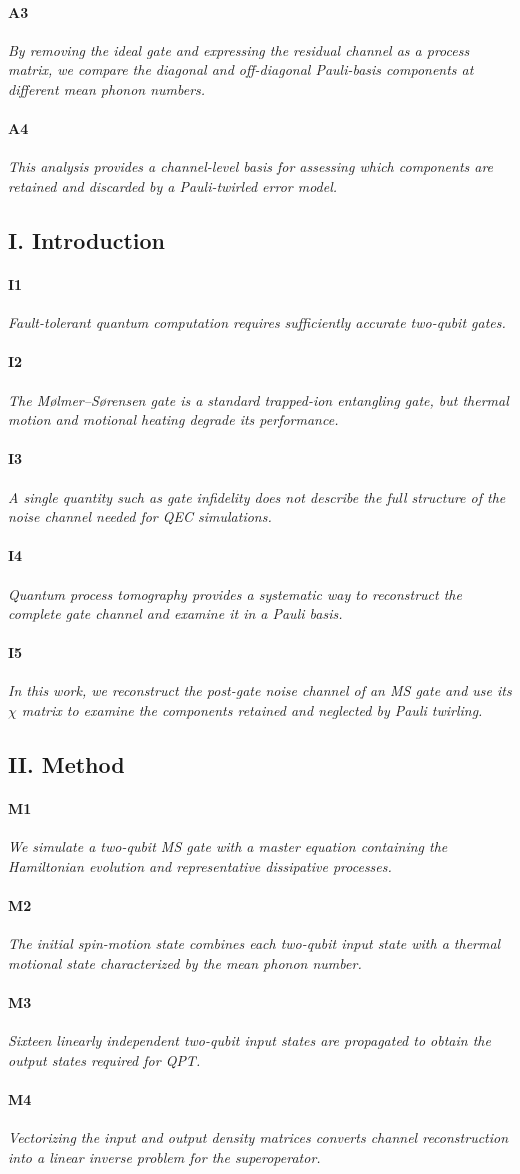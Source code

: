 \documentclass[dvipdfmx,a4paper,11pt]{jsarticle}
\newcommand{\topicsentence}[2]{%
  \paragraph{#1}\textit{#2}\par
}
\begin{document}
\topicsentence{A3}{By removing the ideal gate and expressing the residual channel as a process matrix, we compare the diagonal and off-diagonal Pauli-basis components at different mean phonon numbers.}

\topicsentence{A4}{This analysis provides a channel-level basis for assessing which components are retained and discarded by a Pauli-twirled error model.}

\subsection{I. Introduction}

\topicsentence{I1}{Fault-tolerant quantum computation requires sufficiently accurate two-qubit gates.}

\topicsentence{I2}{The M{\o}lmer--S{\o}rensen gate is a standard trapped-ion entangling gate, but thermal motion and motional heating degrade its performance.}

\topicsentence{I3}{A single quantity such as gate infidelity does not describe the full structure of the noise channel needed for QEC simulations.}

\topicsentence{I4}{Quantum process tomography provides a systematic way to reconstruct the complete gate channel and examine it in a Pauli basis.}

\topicsentence{I5}{In this work, we reconstruct the post-gate noise channel of an MS gate and use its $\chi$ matrix to examine the components retained and neglected by Pauli twirling.}

\subsection{II. Method}

\topicsentence{M1}{We simulate a two-qubit MS gate with a master equation containing the Hamiltonian evolution and representative dissipative processes.}

\topicsentence{M2}{The initial spin-motion state combines each two-qubit input state with a thermal motional state characterized by the mean phonon number.}

\topicsentence{M3}{Sixteen linearly independent two-qubit input states are propagated to obtain the output states required for QPT.}

\topicsentence{M4}{Vectorizing the input and output density matrices converts channel reconstruction into a linear inverse problem for the superoperator.}
\end{document}
